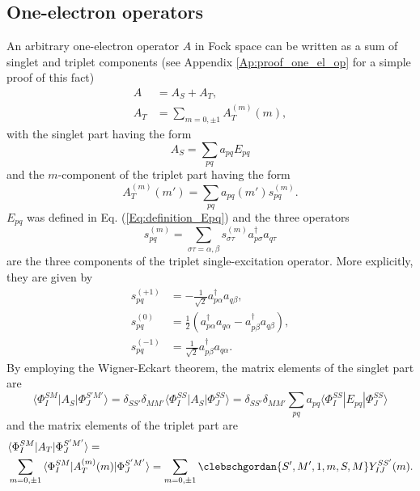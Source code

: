 \subsection{One-electron operators}
An arbitrary one-electron operator $A$ in Fock space can be written as a sum of singlet and triplet components (see Appendix \ref{Ap:proof_one_el_op} for a simple proof of this fact)
	\begin{align}
	A &= {A_S} + {A_T}, \label{Eq:one_el_op} \\ 	
	{A_T} &= \sum\limits_{m = 0, \pm 1} {A_T^{(m)}} (m), \label{Eq:triplet_op}
	\end{align} 	
with the singlet part having the form
	\begin{equation}
	\label{Eq:singlet_op}
	{A_S} = \sum\limits_{pq} {{a_{pq}}} {E_{pq}}
	\end{equation}
and the $m$-component of the triplet part having the form
	\begin{equation}
	\label{Eq:triplet_op_comp}
	A_T^{(m)}(m') = \sum\limits_{pq} {{a_{pq}}} (m')s_{pq}^{(m)}.
	\end{equation} 	
$E_{pq}$ was defined in Eq. (\ref{Eq:definition_Epq}) and the three operators
	\begin{equation}
	s_{pq}^{(m)} = \sum\limits_{\sigma \tau  = \alpha ,\beta } {s_{\sigma \tau }^{(m)}} a_{p\sigma }^\dag {a_{q\tau }}
	\end{equation} 	
are the three components of the triplet single-excitation operator. More explicitly, they are given by
	\begin{align}
	s_{pq}^{( + 1)} &=  - \frac{1}{{\sqrt 2 }}a_{p\alpha }^\dag {a_{q\beta }}, \\
	s_{pq}^{(0)} &= \frac{1}{2}(a_{p\alpha }^\dag {a_{q\alpha }} - a_{p\beta }^\dag {a_{q\beta }}), \\
	s_{pq}^{( - 1)} &= \frac{1}{{\sqrt 2 }}a_{p\beta }^\dag {a_{q\alpha }}.
	\end{align} 	
By employing the Wigner-Eckart theorem, the matrix elements of the singlet part are
	\begin{equation}\langle \Phi _I^{SM}|{A_S}|\Phi _J^{S'M'}\rangle  = {\delta _{SS'}}{\delta _{MM'}}\langle \Phi _I^{SS}|{A_S}|\Phi _J^{SS}\rangle  = {\delta _{SS'}}{\delta _{MM'}}\sum\limits_{pq} {{a_{pq}}} \langle \Phi _I^{SS}|{E_{pq}}|\Phi _J^{SS}\rangle 
	\end{equation} 	
and the matrix elements of the triplet part are
	\begin{equation}
	\label{Eq:triplet_matrixel}
	\begin{aligned}
	&\langle \Phi _I^{SM}|{A_T}|\Phi _J^{S'M'}\rangle  = \\
	&\sum\limits_{m = 0, \pm 1} {\langle \Phi _I^{SM}|A_T^{(m)}(m)|\Phi _J^{S'M'}\rangle }  = \sum\limits_{m = 0, \pm 1}  \clebschgordan{S',M',1,m,S,M} Y_{IJ}^{SS'}(m).
\end{aligned}
\end{equation} 
